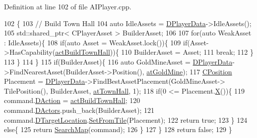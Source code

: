Definition at line 102 of file A\+I\+Player.\+cpp.


\begin{DoxyCode}
102                                                            \{
103     \textcolor{comment}{// Build Town Hall}
104     \textcolor{keyword}{auto} IdleAssets = \hyperlink{classCAIPlayer_a83b5113c8f7e80df54940b647c5ee2e6}{DPlayerData}->IdleAssets();
105     std::shared\_ptr< CPlayerAsset > BuilderAsset;
106     
107     \textcolor{keywordflow}{for}(\textcolor{keyword}{auto} WeakAsset : IdleAssets)\{
108         \textcolor{keywordflow}{if}(\textcolor{keyword}{auto} Asset = WeakAsset.lock())\{
109             \textcolor{keywordflow}{if}(Asset->HasCapability(\hyperlink{GameDataTypes_8h_a35b98ce26aca678b03c6f9f76e4778cea0b5f001e8c77b8a87998da6320595498}{actBuildTownHall}))\{
110                 BuilderAsset = Asset;
111                 \textcolor{keywordflow}{break};
112             \}
113         \}
114     \}
115     \textcolor{keywordflow}{if}(BuilderAsset)\{
116         \textcolor{keyword}{auto} GoldMineAsset = \hyperlink{classCAIPlayer_a83b5113c8f7e80df54940b647c5ee2e6}{DPlayerData}->FindNearestAsset(BuilderAsset->Position(), 
      \hyperlink{GameDataTypes_8h_a5600d4fc433b83300308921974477feca243d9ba44092eadd561db058d742b3b3}{atGoldMine});
117         \hyperlink{classCPosition}{CPosition} Placement = \hyperlink{classCAIPlayer_a83b5113c8f7e80df54940b647c5ee2e6}{DPlayerData}->FindBestAssetPlacement(GoldMineAsset->
      TilePosition(), BuilderAsset, \hyperlink{GameDataTypes_8h_a5600d4fc433b83300308921974477feca5c0fa8a0f367f3358365536d3c7aa321}{atTownHall}, 1);
118         \textcolor{keywordflow}{if}(0 <= Placement.\hyperlink{classCPosition_a9a6b94d3b91df1492d166d9964c865fc}{X}())\{
119             command.\hyperlink{structSPlayerCommandRequest_a80897bbccf2c4e0b148a7aa815a926c6}{DAction} = \hyperlink{GameDataTypes_8h_a35b98ce26aca678b03c6f9f76e4778cea0b5f001e8c77b8a87998da6320595498}{actBuildTownHall};
120             command.\hyperlink{structSPlayerCommandRequest_aa37fc01519676345703d78b9f573894a}{DActors}.push\_back(BuilderAsset);
121             command.\hyperlink{structSPlayerCommandRequest_a701702b94ca2fd2738e95ef6711dd41a}{DTargetLocation}.\hyperlink{classCPosition_a46994e6a8b8e3b4237edd7259ad844b6}{SetFromTile}(Placement);
122             \textcolor{keywordflow}{return} \textcolor{keyword}{true};
123         \}
124         \textcolor{keywordflow}{else}\{
125             \textcolor{keywordflow}{return} \hyperlink{classCAIPlayer_afafbe8fc589e09a16ae1f02f2794d7b0}{SearchMap}(command);  
126         \}
127     \}
128     \textcolor{keywordflow}{return} \textcolor{keyword}{false};
129 \}
\end{DoxyCode}
